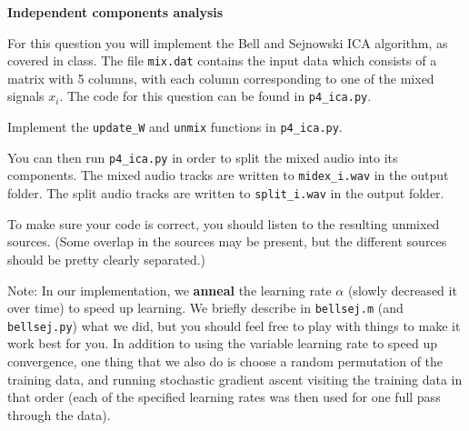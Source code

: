 \clearpage
\item {} {\bf Independent components analysis}

For this question you will implement the Bell and Sejnowski ICA algorithm,
as covered in class. The file {\tt mix.dat} contains the input data which consists of a matrix
with 5 columns, with each column corresponding to one of the mixed signals
$x_i$. The code for this question can be found in \texttt{p4\_ica.py}.

Implement the \texttt{update\_W} and \texttt{unmix} functions in \texttt{p4\_ica.py}. 

You can then run \texttt{p4\_ica.py} in order to split the mixed audio into its components.
The mixed audio tracks are written to \texttt{midex\_i.wav} in the output folder. 
The split audio tracks are written to \texttt{split\_i.wav} in the output folder.

To make sure your code is correct, you should listen to the
resulting unmixed sources.  (Some overlap in the sources may be present,
but the different sources should be pretty clearly separated.)

Note: In our implementation, we {\bf anneal} the learning rate $\alpha$
(slowly decreased it over time) to speed up learning.  We briefly describe
in {\tt bellsej.m} (and {\tt bellsej.py}) what we did, but you should feel free to play with
things to make it work best for you.  In addition to using the variable
learning rate to speed up convergence, one thing that we also do is
choose a random permutation of the training data, and running stochastic
gradient ascent visiting the training data in that order (each of the
specified learning rates was then used for one full pass through the data).
